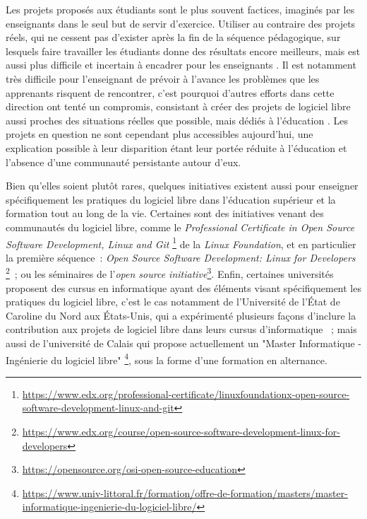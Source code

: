 \documentclass[dvipsnames]{llncs}
\newcommand{\en}[1]{\foreignlanguage{english}{\emph{#1}}}
\begin{document}
    Les projets proposés aux étudiants sont le plus souvent factices, imaginés par les enseignants dans le
    seul but de servir d'exercice. Utiliser au contraire des projets réels, qui ne cessent pas d'exister après
    la fin de la séquence pédagogique, sur lesquels faire travailler les étudiants donne des résultats encore
    meilleurs, mais est aussi plus difficile et incertain à encadrer pour les enseignants \cite{real-pbl-2010,
    real-pbl-2004}. Il est notamment très difficile pour l'enseignant de prévoir à l'avance les problèmes que
    les apprenants risquent de rencontrer, c'est pourquoi d'autres efforts dans cette direction ont tenté un
    compromis, consistant à créer des projets de logiciel libre aussi proches des situations réelles que
    possible, mais dédiés à l'éducation \cite{oss-edu-2008}. Les projets en question ne sont cependant plus
    accessibles aujourd'hui, une explication possible à leur disparition étant leur portée réduite à
    l'éducation et l'absence d'une communauté persistante autour d'eux.

    Bien qu'elles soient plutôt rares, quelques initiatives existent aussi pour enseigner spécifiquement les
    pratiques du logiciel libre dans l'éducation supérieur et la formation tout au long de la vie. Certaines
    sont des initiatives venant des communautés du logiciel libre, comme le \en{Professional Certificate in
    Open Source Software Development, Linux and Git}%
    \footnote{\url{https://www.edx.org/professional-certificate/linuxfoundationx-open-source-software-development-linux-and-git}}
    de la \en{Linux Foundation}, et en particulier la première séquence : \en{Open Source Software
    Development: Linux for Developers}%
    \footnote{\url{https://www.edx.org/course/open-source-software-development-linux-for-developers}} ; ou les
    séminaires de l'\en{open source
    initiative}\footnote{\url{https://opensource.org/osi-open-source-education}}. Enfin, certaines universités
    proposent des cursus en informatique ayant des éléments visant spécifiquement les pratiques du logiciel
    libre, c'est le cas notamment de l'Université de l'État de Caroline du Nord aux États-Unis, qui a
    expérimenté plusieurs façons d'inclure la contribution aux projets de logiciel libre dans leurs cursus
    d'informatique \cite{oss-edu-2008, oss-edu-2007} ; mais aussi de l'université de Calais qui propose
    actuellement un "Master Informatique - Ingénierie du logiciel libre"%
    \footnote{\url{https://www.univ-littoral.fr/formation/offre-de-formation/masters/master-informatique-ingenierie-du-logiciel-libre/}},
    sous la forme d'une formation en alternance.
\end{document}
